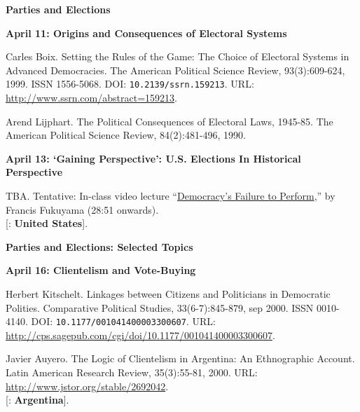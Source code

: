 \documentclass[letterpaper]{article}
\renewenvironment{itemize}{
  \begin{list}{}{
    \setlength{\leftmargin}{1.5em}
  }
}{
  \end{list}
}
\begin{document}
\begin{enumerate}
\vspace{2mm}


\item {\bf Parties and Elections}
	\begin{itemize} 
		\item {\bf April 11: Origins and Consequences of Electoral Systems}
			\begin{itemize} 
				\item[$\bullet$] Carles Boix. Setting the Rules of the Game: The Choice of Electoral Systems in Advanced Democracies. The American Political Science Review, 93(3):609-624, 1999. ISSN 1556-5068. DOI: \texttt{10.2139/ssrn.159213}. URL: \url{http://www.ssrn.com/abstract=159213}.
				\item[$\bullet$] Arend Lijphart. The Political Consequences of Electoral Laws, 1945-85. The American Political Science Review, 84(2):481-496, 1990.
			\end{itemize}
		\item {\bf April 13: `Gaining Perspective': U.S. Elections In Historical Perspective}
			\begin{itemize}
				\item[$\bullet$] TBA. Tentative: In-class video lecture ``\href{https://www.youtube.com/watch?v=gF8CJSQf238}{Democracy's Failure to Perform},'' by Francis Fukuyama (28:51 onwards).\\
			{\color{brown}[\faGlobe: {\bf United States}].}
			\end{itemize}
	\end{itemize}


\item {\bf Parties and Elections: Selected Topics}
	\begin{itemize} 
		\item {\bf April 16: Clientelism and Vote-Buying}
		\begin{itemize}
			\item[$\bullet$] Herbert Kitschelt. Linkages between Citizens and Politicians in Democratic Polities. Comparative Political Studies, 33(6-7):845-879, sep 2000. ISSN 0010-4140. DOI: \texttt{10.1177/001041400003300607}. URL: \url{http://cps.sagepub.com/cgi/doi/10.1177/001041400003300607}.
			\item[$\bullet$] Javier Auyero. The Logic of Clientelism in Argentina: An Ethnographic Account. Latin American Research Review, 35(3):55-81, 2000. URL: \url{http://www.jstor.org/stable/2692042}.\\
			{\color{brown}[\faGlobe: {\bf Argentina}].}


\end{itemize}
\end{itemize}
\end{enumerate}
\end{document}
